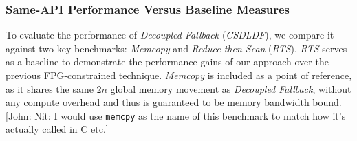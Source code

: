 \documentclass[sigconf]{acmart}
\newcommand{\john}[1]{{\footnotesize\color{cyan}[John: #1]}}
\begin{document}
\subsubsection{Same-API Performance Versus Baseline Measures}
To evaluate the performance of \emph{Decoupled Fallback} (\emph{CSDLDF}), we compare it against two key benchmarks: \emph{Memcopy}\textdagger{~\ref{sec:memcopy}} and \emph{Reduce then Scan}\textdagger{~\ref{sec:rts}} (\emph{RTS}). \emph{RTS} serves as a baseline to demonstrate the performance gains of our approach over the previous FPG-constrained technique. \emph{Memcopy} is included as a point of reference, as it shares the same $2n$ global memory movement as \emph{Decoupled Fallback}, without any compute overhead and thus is guaranteed to be memory bandwidth bound. \john{Nit: I would use \texttt{memcpy} as the name of this benchmark to match how it's actually called in C etc.}
\end{document}
